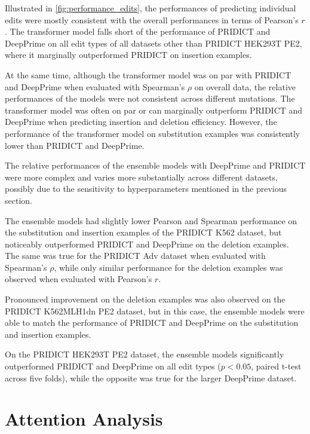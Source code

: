 Illustrated in \autoref{fig:performance_edits}, the performances of predicting individual edits were mostly consistent with the overall performances in terms of Pearson's $r$. The transformer model falls short of the performance of PRIDICT and DeepPrime on all edit types of all datasets other than PRIDICT HEK293T PE2, where it marginally outperformed PRIDICT on insertion examples.

At the same time, although the transformer model was on par with PRIDICT and DeepPrime when evaluated with Spearman's $\rho$ on overall data, the relative performances of the models were not consistent across different mutations. The transformer model was often on par or can marginally outperform PRIDICT and DeepPrime when predicting insertion and deletion efficiency. However, the performance of the transformer model on substitution examples was consistently lower than PRIDICT and DeepPrime.

The relative performances of the ensemble models with DeepPrime and PRIDICT were more complex and varies more substantially across different datasets, possibly due to the sensitivity to hyperparameters mentioned in the previous section. 

The ensemble models had slightly lower Pearson and Spearman performance on the substitution and insertion examples of the PRIDICT K562 dataset, but noticeably outperformed PRIDICT and DeepPrime on the deletion examples. The same was true for the PRIDICT Adv dataset when evaluated with Spearman's $\rho$, while only similar performance for the deletion examples was observed when evaluated with Pearson's $r$.

Pronounced improvement on the deletion examples was also observed on the PRIDICT K562MLH1dn PE2 dataset, but in this case, the ensemble models were able to match the performance of PRIDICT and DeepPrime on the substitution and insertion examples.

On the PRIDICT HEK293T PE2 dataset, the ensemble models significantly outperformed PRIDICT and DeepPrime on all edit types ($p<0.05$, paired t-test across five folds), while the opposite was true for the larger DeepPrime dataset.

\section{Attention Analysis}
\label{sec:attention_analysis}

